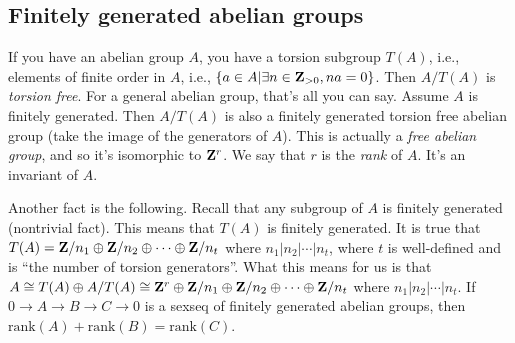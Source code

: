 \subsection{Finitely generated abelian groups}
If you have an abelian group $A$, you have a torsion subgroup $T(A)$, i.e., elements of finite order in $A$, i.e., $\{a\in A|\exists n\in \mathbf Z_{>0},na=0\}$. Then $A/T(A)$ is \emph{torsion free}. For a general abelian group, that's all you can say. Assume $A$ is finitely generated. Then $A/T(A)$ is also a finitely generated torsion free abelian group (take the image of the generators of $A$). This is actually a \emph{free abelian group}, and so it's isomorphic to $\mathbf Z^r$. We say that $r$ is the \emph{rank} of $A$. It's an invariant of $A$.

Another fact is the following. Recall that any subgroup of $A$ is finitely generated (nontrivial fact). This means that $T(A)$ is finitely generated. It is true that $T(A)=\mathbf Z/n_1\oplus\mathbf Z/n_2\oplus\cdots\oplus\mathbf Z/n_t$ where $n_1|n_2|\cdots|n_t$, where $t$ is well-defined and is ``the number of torsion generators''. What this means for us is that $A\cong T(A)\oplus A/T(A)\cong \mathbf Z^r\oplus\mathbf Z/n_1\oplus\mathbf Z/n_2\oplus\cdots\oplus\mathbf Z/n_t$ where $n_1|n_2|\cdots|n_t$. If $0\to A\to B\to C\to 0$ is a sexseq of finitely generated abelian groups, then $\text{rank}(A)+\text{rank}(B)=\text{rank}(C)$.
